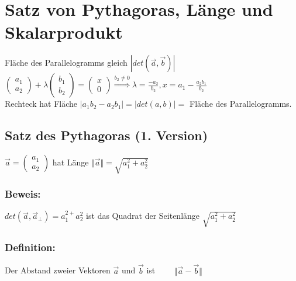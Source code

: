 \section{Satz von Pythagoras, Länge und Skalarprodukt}
%
%
%
%
Fläche des Parallelogramms gleich $|det(\vec{a},\vec{b})|$\\
$\begin{pmatrix} a_{1} \\ a_{2} \end{pmatrix} + \lambda \begin{pmatrix} b_{1} \\ b_{2} \end{pmatrix} = \begin{pmatrix} x \\ 0 \end{pmatrix} \mathop{\Rightarrow}\limits^{b_{2} \neq 0} \lambda = \frac{-a_{2}}{b_{2}}, x=a_{1}-\frac{a_{2}b_{1}}{b_{2}}$ \\
Rechteck hat Fläche $\vert a_{1}b_{2}-a_{2}b_{1}\vert=\vert det(a,b) \vert =$ Fläche des Parallelogramms. 
%
%
%
\subsection{Satz des Pythagoras (1. Version)}
$\vec{a} = \begin{pmatrix} a_{1} \\ a_{2} \end{pmatrix}$ hat Länge $\Vert \vec{a} \Vert = \sqrt{a_{1}^{2} + a_{2}^{2}}$
%
%
%
\subsubsection{Beweis:}
$det(\vec{a},\vec{a}_{\perp})=a_{1}^{2+}a_{2}^{2}$ ist das Quadrat der Seitenlänge $\sqrt{a_{1}^{2}+a_{2}^{2}}$
%
%
%
\subsubsection{Definition:}
Der Abstand zweier Vektoren $\vec{a}$ und $\vec{b}$ ist $ \qquad \Vert \vec{a}-\vec{b} \Vert$
%
%
%
